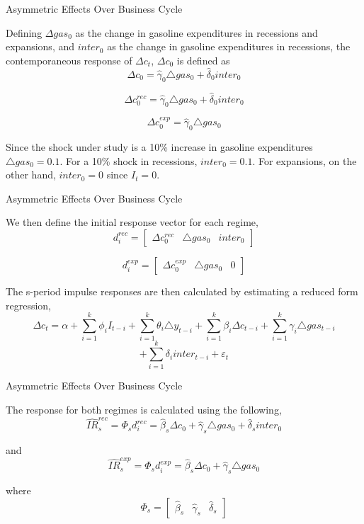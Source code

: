 \documentclass[
  10pt,
  ignorenonframetext,
]{beamer}
\begin{document}
\begin{frame}{Asymmetric Effects Over Business Cycle}
\protect\hypertarget{asymmetric-effects-over-business-cycle-4}{}

Defining \(\Delta gas_0\) as the change in gasoline expenditures in
recessions and expansions, and \(inter_0\) as the change in gasoline
expenditures in recessions, the contemporaneous response of
\(\Delta c_t\), \(\Delta c_0\) is defined as
\[\Delta c_{0}=\hat{\gamma}_{0}\triangle gas_{0}+\hat{\delta}_{0}inter_{0}\]

\[\Delta c_{0}^{rec}=\hat{\gamma}_{0}\triangle gas_{0}+\hat{\delta}_{0}inter_{0}\]

\[\Delta c_{0}^{exp}=\hat{\gamma}_{0}\triangle gas_{0}\]

Since the shock under study is a 10\% increase in gasoline expenditures
\(\triangle gas_{0}=0.1\). For a 10\% shock in recessions,
\(inter_{0}=0.1\). For expansions, on the other hand, \(inter_{0}=0\)
since \(I_{t}=0\).

\end{frame}

\begin{frame}{Asymmetric Effects Over Business Cycle}
\protect\hypertarget{asymmetric-effects-over-business-cycle-5}{}

We then define the initial response vector for each regime,
\[d_{i}^{rec}=\begin{bmatrix}\Delta c_{0}^{rec} & \triangle gas_{0} & inter_{0}\end{bmatrix}\]

\[d_{i}^{exp}=\begin{bmatrix}\Delta c_{0}^{exp} & \triangle gas_{0} & 0\end{bmatrix}\]

The s-period impulse responses are then calculated by estimating a
reduced form regression,
\[\Delta c_{t}=\alpha+\sum_{i=1}^{k}\phi_{i}I_{t-i}+\sum_{i=1}^{k}\theta_{i}\triangle y_{t-i}+\sum_{i=1}^{k}\beta_{i}\Delta c_{t-i}+\sum_{i=1}^{k}\gamma_{i}\triangle gas_{t-i}\]
\[+\sum_{i=1}^{k}\delta_{i}inter_{t-i}+\varepsilon_{t}\]

\end{frame}

\begin{frame}{Asymmetric Effects Over Business Cycle}
\protect\hypertarget{asymmetric-effects-over-business-cycle-6}{}

The response for both regimes is calculated using the following,
\[\hat{IR}_{s}^{rec}=\Phi_{s}d_{i}^{rec}=\hat{\beta}_{s}\Delta c_{0}+\hat{\gamma}_{s}\triangle gas_{0}+\hat{\delta}_{s}inter_{0}\]

and
\[\hat{IR}_{s}^{exp}=\Phi_{s}d_{i}^{exp}=\hat{\beta}_{s}\Delta c_{0}+\hat{\gamma}_{s}\triangle gas_{0}\]

where
\[\Phi_{s}=\begin{bmatrix}\hat{\beta}_{s} & \hat{\gamma}_{s} & \hat{\delta}_{s}\end{bmatrix}\]

\end{frame}
\end{document}
